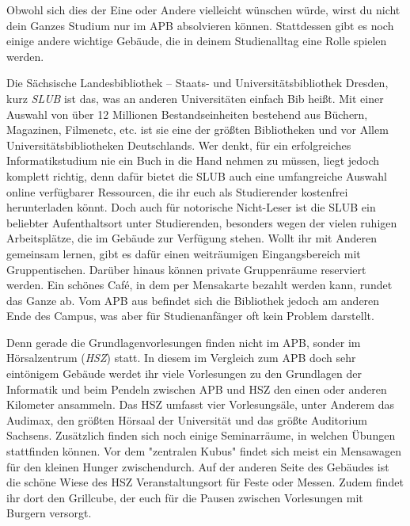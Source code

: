 
Obwohl sich dies der Eine oder Andere vielleicht wünschen würde, wirst du nicht dein Ganzes Studium nur im APB absolvieren können.
Stattdessen gibt es noch einige andere wichtige Gebäude, die in deinem Studienalltag eine Rolle spielen werden.


Die Sächsische Landesbibliothek – Staats- und Universitätsbibliothek Dresden, kurz \emph{SLUB} ist das, was an anderen Universitäten einfach Bib heißt.
Mit einer Auswahl von über 12 Millionen Bestandseinheiten bestehend aus Büchern, Magazinen, Filmenetc, etc. ist sie eine der größten Bibliotheken und vor Allem Universitätsbibliotheken Deutschlands.
Wer denkt, für ein erfolgreiches Informatikstudium nie ein Buch in die Hand nehmen zu müssen, liegt jedoch komplett richtig, denn dafür bietet die SLUB auch eine umfangreiche Auswahl online verfügbarer Ressourcen, die ihr euch als Studierender kostenfrei herunterladen könnt.
Doch auch für notorische Nicht-Leser ist die SLUB ein beliebter Aufenthaltsort unter Studierenden, besonders wegen der vielen ruhigen Arbeitsplätze, die im Gebäude zur Verfügung stehen.
Wollt ihr mit Anderen gemeinsam lernen, gibt es dafür einen weiträumigen Eingangsbereich mit Gruppentischen.
Darüber hinaus können private Gruppenräume reserviert werden. Ein schönes Café, in dem per Mensakarte bezahlt werden kann, rundet das Ganze ab.
Vom APB aus befindet sich die Bibliothek jedoch am anderen Ende des Campus, was aber für Studienanfänger oft kein Problem darstellt.


Denn gerade die Grundlagenvorlesungen finden nicht im APB, sonder im Hörsalzentrum (\emph{HSZ}) statt.
In diesem im Vergleich zum APB doch sehr eintönigem Gebäude werdet ihr viele Vorlesungen zu den Grundlagen der Informatik und beim Pendeln zwischen APB und HSZ den einen oder anderen Kilometer ansammeln.
Das HSZ umfasst vier Vorlesungsäle, unter Anderem das Audimax, den größten Hörsaal der Universität und das größte Auditorium Sachsens.
Zusätzlich finden sich noch einige Seminarräume, in welchen Übungen stattfinden können. Vor dem "zentralen Kubus" findet sich meist ein Mensawagen für den kleinen Hunger zwischendurch.
Auf der anderen Seite des Gebäudes ist die schöne Wiese des HSZ Veranstaltungsort für Feste oder Messen.
Zudem findet ihr dort den Grillcube, der euch für die Pausen zwischen Vorlesungen mit Burgern versorgt.


